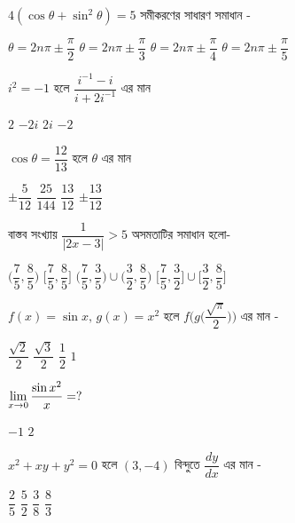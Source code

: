 \documentclass[addpoints]{exam}
\begin{document}
\begin{questions}
\question $ 4(\cos\theta +\sin^{2}\theta) =5 $ সমীকরণের সাধারণ সমাধান -

\begin{oneparchoices}
\choice $ \theta = 2n\pi \pm \dfrac{\pi}{2} $
\choice $ \theta = 2n\pi \pm \dfrac{\pi}{3} $
\choice $ \theta = 2n\pi \pm \dfrac{\pi}{4} $
\choice $ \theta = 2n\pi \pm \dfrac{\pi}{5} $
\end{oneparchoices}

\question $ i^{2}=-1 $ হলে $ \dfrac{i^{-1}-i}{i+2i^{-1}} $ এর মান

\begin{oneparchoices}
\choice $ 2 $
\choice $ -2i $
\choice $ 2i $
\choice  $ -2 $
\end{oneparchoices}

\question $ \cos\theta = \dfrac{12}{13} $ হলে $ \theta $ এর মান

\begin{oneparchoices}
\choice $ \pm \dfrac{5}{12} $
\choice $  \dfrac{25}{144} $
\choice $ \dfrac{13}{12} $
\choice  $ \pm \dfrac{13}{12} $
\end{oneparchoices}

\question   বাস্তব সংখ্যায় $ \dfrac{1}{|2x-3|}> 5 $ অসমতাটির সমাধান হলো-

\begin{oneparchoices}
\choice $ \Big(\dfrac{7}{5}, \dfrac{8}{5}\Big)$
\choice $ \Big[\dfrac{7}{5}, \dfrac{8}{5}\Big]$
\choice $ \Big(\dfrac{7}{5}, \dfrac{3}{5}\Big)\cup \Big(\dfrac{3}{2}, \dfrac{8}{5}\Big)  $
\choice $ \Big[\dfrac{7}{5}, \dfrac{3}{2}\Big]\cup \Big[\dfrac{3}{2}, \dfrac{8}{5}\Big]  $
\end{oneparchoices}

\question $ f(x) = \sin x,\, g(x)=x^{2} $ হলে $ f\Big(g\Big(\dfrac{\sqrt{\pi}}{2}\Big) \Big) $ এর মান - 

\begin{oneparchoices}
\choice $ \dfrac{\sqrt{2}}{2} $
\choice $  \dfrac{\sqrt{3}}{2} $
\choice $ \dfrac{1}{2} $
\choice  $ 1 $
\end{oneparchoices}

\question  $ \mathlarger{\lim_{x\to 0} \dfrac{\sin x^{2}}{x}}=? $ 

\begin{oneparchoices}
\choice $ -1 $
\choice $ 2 $
\end{oneparchoices}

\question $ x^{2}+xy+ y^{2}=0  $ হলে $ (3,-4) $ বিন্দুতে $ \dfrac{dy}{dx} $ এর মান - 

\begin{oneparchoices}
\choice $ \dfrac{2}{5} $
\choice $ \dfrac{5}{2} $
\choice $ \dfrac{3}{8} $
\choice $ \dfrac{8}{3} $
\end{oneparchoices}


\end{questions}
\end{document}
